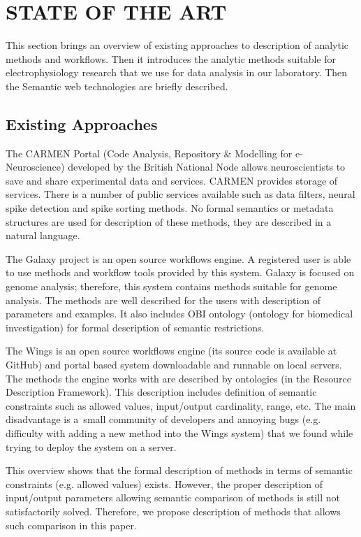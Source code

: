 \documentclass[a4paper,twoside]{article}
\begin{document}
\section{\uppercase{State of the Art}}

\noindent This section brings an overview of existing approaches to description of analytic methods and workflows. Then it introduces the analytic methods suitable for electrophysiology research that we use for data analysis in our laboratory. Then the Semantic web technologies are briefly described.

\subsection{Existing Approaches}

The CARMEN Portal \cite{Watson07} (Code Analysis, Repository \& Modelling for e-Neuroscience) developed by the British National Node allows neuroscientists to save and share experimental data and services. CARMEN provides storage of services. There is a number of public services available such as data filters, neural spike detection and spike sorting methods. No formal semantics or metadata structures are used for description of these methods, they are described in a natural language.

The Galaxy project \cite{goecks2010galaxy, blankenberg2010galaxy, giardine2005galaxy} is an open source workflows engine. A registered user is able to use methods and workflow tools provided by this system. Galaxy is focused on genome analysis; therefore, this system contains methods suitable for genome analysis. The methods are well described for the users with description of parameters and examples. It also includes OBI ontology (ontology for biomedical investigation) for formal description of semantic restrictions.

The Wings is an open source workflows engine (its source code is available at GitHub) and portal based system downloadable and runnable on local servers. The methods the engine works with are described by ontologies (in the Resource Description Framework). This description includes definition of semantic constraints such as allowed values, input/output cardinality, range, etc. The main disadvantage is a~small community of developers and annoying bugs (e.g. difficulty with adding a new method into the Wings system) that we found while trying to deploy the system on a server.

This overview shows that the formal description of methods in terms of semantic constraints (e.g. allowed values) exists. However, the proper description of input/output parameters allowing semantic comparison of methods is still not satisfactorily solved. Therefore, we propose description of methods that allows such comparison in this paper.
\end{document}
